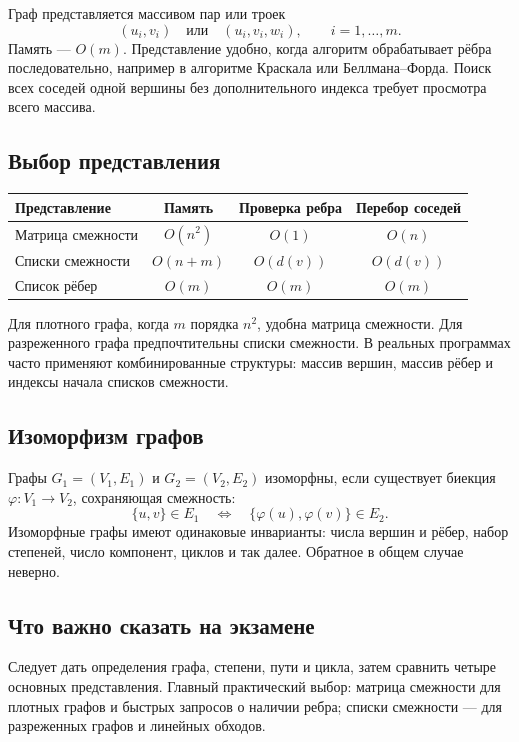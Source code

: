 Граф представляется массивом пар или троек
\[
    (u_i,v_i)\quad\text{или}\quad(u_i,v_i,w_i),\qquad i=1,\ldots,m.
\]
Память --- $O(m)$. Представление удобно, когда алгоритм обрабатывает рёбра
последовательно, например в алгоритме Краскала или Беллмана--Форда. Поиск всех
соседей одной вершины без дополнительного индекса требует просмотра всего
массива.

\subsection{Выбор представления}

\begin{center}
\renewcommand{\arraystretch}{1.25}
\begin{tabular}{|l|c|c|c|}
\hline
Представление & Память & Проверка ребра & Перебор соседей \\
\hline
Матрица смежности & $O(n^2)$ & $O(1)$ & $O(n)$ \\
Списки смежности & $O(n+m)$ & $O(d(v))$ & $O(d(v))$ \\
Список рёбер & $O(m)$ & $O(m)$ & $O(m)$ \\
\hline
\end{tabular}
\end{center}

Для плотного графа, когда $m$ порядка $n^2$, удобна матрица смежности. Для
разреженного графа предпочтительны списки смежности. В реальных программах
часто применяют комбинированные структуры: массив вершин, массив рёбер и
индексы начала списков смежности.

\subsection{Изоморфизм графов}

Графы $G_1=(V_1,E_1)$ и $G_2=(V_2,E_2)$ изоморфны, если существует биекция
$\varphi\colon V_1\to V_2$, сохраняющая смежность:
\[
    \{u,v\}\in E_1
    \quad\Longleftrightarrow\quad
    \{\varphi(u),\varphi(v)\}\in E_2.
\]
Изоморфные графы имеют одинаковые инварианты: числа вершин и рёбер, набор
степеней, число компонент, циклов и так далее. Обратное в общем случае неверно.

\subsection{Что важно сказать на экзамене}

Следует дать определения графа, степени, пути и цикла, затем сравнить четыре
основных представления. Главный практический выбор: матрица смежности для
плотных графов и быстрых запросов о наличии ребра; списки смежности --- для
разреженных графов и линейных обходов.

\newpage